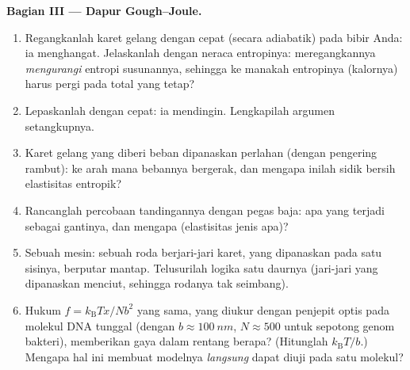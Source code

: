 \begin{problem}
\medskip\noindent\textbf{Bagian III --- Dapur Gough--Joule.}
\begin{enumerate}[resume]
  \item Regangkanlah karet gelang dengan cepat (secara adiabatik) pada
        bibir Anda: ia menghangat. Jelaskanlah dengan neraca entropinya:
        meregangkannya \emph{mengurangi} entropi susunannya, sehingga ke
        manakah entropinya (kalornya) harus pergi pada total yang tetap?
  \item Lepaskanlah dengan cepat: ia mendingin. Lengkapilah argumen
        setangkupnya.
  \item Karet gelang yang diberi beban dipanaskan perlahan (dengan
        pengering rambut): ke arah mana bebannya bergerak, dan mengapa
        inilah sidik bersih elastisitas entropik?
  \item Rancanglah percobaan tandingannya dengan pegas baja: apa yang
        terjadi sebagai gantinya, dan mengapa (elastisitas jenis apa)?
  \item Sebuah mesin: sebuah roda berjari-jari karet, yang dipanaskan
        pada satu sisinya, berputar mantap. Telusurilah logika satu
        daurnya (jari-jari yang dipanaskan menciut, sehingga rodanya tak
        seimbang).
  \item Hukum $f = k_{\text{B}}Tx/Nb^2$ yang sama, yang diukur dengan
        penjepit optis pada molekul DNA tunggal (dengan $b \approx
        \qty{100}{nm}$, $N \approx 500$ untuk sepotong genom bakteri),
        memberikan gaya dalam rentang berapa? (Hitunglah
        $k_{\text{B}}T/b$.) Mengapa hal ini membuat modelnya
        \emph{langsung} dapat diuji pada satu molekul?
\end{enumerate}


\end{problem}
